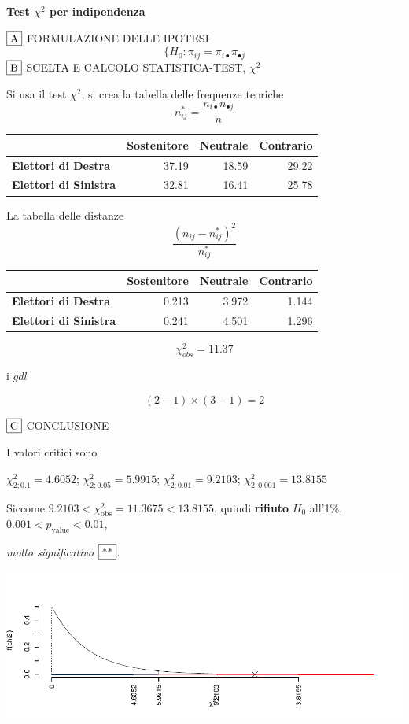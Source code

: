 \documentclass[
  11pt,
]{book}
\theoremstyle{mytheoremstyle}
\theoremstyle{mydefstyle}
\newenvironment{sol}
  {
  \begin{tcolorbox}[enhanced,breakable,arc=0.1mm,boxrule=1pt,colback=white,colframe=iblue,
  title=\bf \fontfamily{lmss}\selectfont \hspace{.5 cm} Soluzione,drop fuzzy shadow]

}{
\end{tcolorbox}
  }
\begin{document}
\begin{sol}
\textbf{Test \(\chi^2\) per indipendenza}

\(\fbox{A}\) FORMULAZIONE DELLE IPOTESI
\[
\Big\{H_0:\pi_{ij}=\pi_{i\bullet}\pi_{\bullet j}
\]
\(\fbox{B}\) SCELTA E CALCOLO STATISTICA-TEST, \(\chi^2\)

Si usa il test \(\chi^2\), si crea la tabella delle frequenze teoriche
\[
n_{ij}^*=\frac{n_{i\bullet}n_{\bullet j}}{n}
\]

\begin{table}[H]
\centering
\begin{tabular}{>{}lrrr}
\toprule
  & Sostenitore & Neutrale & Contrario\\
\midrule
\textbf{Elettori di Destra} & 37.19 & 18.59 & 29.22\\
\textbf{Elettori di Sinistra} & 32.81 & 16.41 & 25.78\\
\bottomrule
\end{tabular}
\end{table}

La tabella delle distanze
\[
\frac{(n_{ij}-n_{ij}^*)^2}{n_{ij}^*}
\]

\begin{table}[H]
\centering
\begin{tabular}{>{}lrrr}
\toprule
  & Sostenitore & Neutrale & Contrario\\
\midrule
\textbf{Elettori di Destra} & 0.213 & 3.972 & 1.144\\
\textbf{Elettori di Sinistra} & 0.241 & 4.501 & 1.296\\
\bottomrule
\end{tabular}
\end{table}

\[
    \chi^2_{obs}= 11.37 
  \]

i \(gdl\)

\[
    ( 2 -1)\times( 3 -1)= 2 
  \]

\(\fbox{C}\) CONCLUSIONE

I valori critici sono

\(\chi^2_{2;0.1}=4.6052\); \(\chi^2_{2;0.05}=5.9915\); \(\chi^2_{2;0.01}=9.2103\); \(\chi^2_{2;0.001}=13.8155\)

Siccome \(9.2103<\chi^2_\text{obs}=11.3675<13.8155\), quindi \textbf{rifiuto} \(H_0\) all'1\%, \(0.001<p_\text{value}<0.01\),

\emph{molto significativo} \(\fbox{**}\).

\begin{center}\includegraphics{Esami_passati_con_soluzioni_files/figure-latex/05a-chi2-6-1} \end{center}


\end{sol}
\end{document}
